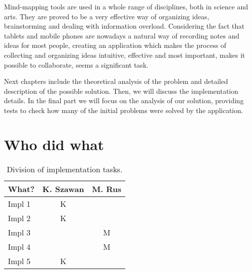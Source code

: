 
Mind-mapping tools are used in a whole range of disciplines, both in science and arts. They are proved to be a very effective way of organizing ideas, brainstorming and dealing with information overload. Considering the fact that tablets and mobile phones are nowadays a natural way of recording notes and ideas for most people, creating an application which makes the process of collecting and organizing ideas intuitive, effective and most important, makes it possible to collaborate, seems a significant task.


Next chapters include the theoretical analysis of the problem and detailed description of the possible solution. Then, we will discuss the implementation details. In the final part we will focus on the analysis of our solution, providing tests to check how many of the initial problems were solved by the application.

\section{Who did what}
\label{sec:who-did-what}


\begin{table}[h]
	\centering
	\begin{tabular}{l|c|c}
		What? & K. Szawan & M. Rus \\
		\hline
		Impl 1 & K & \\
		Impl 2 & K & \\
		Impl 3 & & M\\
		Impl 4 & & M\\
		Impl 5 & K & \\
	\end{tabular}
	\caption{Division of implementation tasks.}
	\label{tab:who-did-impl}
\end{table}

